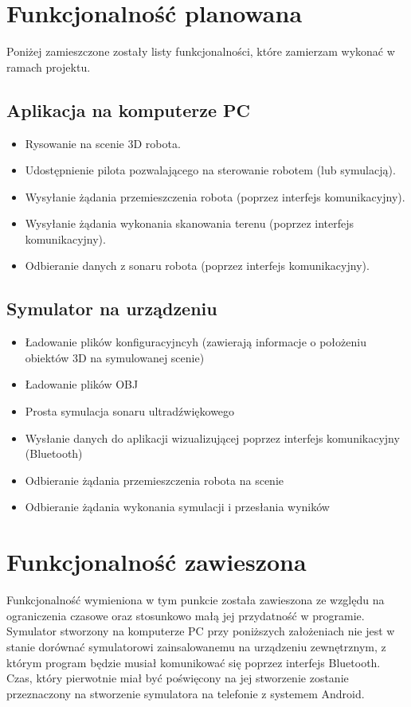 \documentclass[a4paper,12pt]{article}
\begin{document}
\section{Funkcjonalność planowana}
Poniżej zamieszczone zostały listy funkcjonalności, które zamierzam wykonać w ramach projektu. 
\subsection{Aplikacja na komputerze PC}
\begin{itemize}
\item Rysowanie na scenie 3D robota.
\item Udostępnienie pilota pozwalającego na sterowanie robotem (lub symulacją).
\item Wysyłanie żądania przemieszczenia robota (poprzez interfejs komunikacyjny).
\item Wysyłanie żądania wykonania skanowania terenu (poprzez interfejs komunikacyjny).
\item Odbieranie danych z sonaru robota (poprzez interfejs komunikacyjny).

\end{itemize}

\subsection{Symulator na urządzeniu}
\begin{itemize}
\item Ładowanie plików konfiguracyjncyh (zawierają informacje o położeniu obiektów 3D na symulowanej scenie)
\item Ładowanie plików OBJ
\item Prosta symulacja sonaru ultradźwiękowego
\item Wysłanie danych do aplikacji wizualizującej poprzez interfejs komunikacyjny (Bluetooth)
\item Odbieranie żądania przemieszczenia robota na scenie
\item Odbieranie żądania wykonania symulacji i przesłania wyników
\end{itemize}

\section{Funkcjonalność zawieszona}
Funkcjonalność wymieniona w tym punkcie została zawieszona ze względu na ograniczenia czasowe oraz stosunkowo małą jej przydatność w programie.
Symulator stworzony na komputerze PC przy poniższych założeniach nie jest w stanie dorównać symulatorowi zainsalowanemu na urządzeniu zewnętrznym, z którym
program będzie musiał komunikować się poprzez interfejs Bluetooth. Czas, który pierwotnie miał być poświęcony na jej stworzenie zostanie przeznaczony
na stworzenie symulatora na telefonie z systemem Android.
\end{document}
